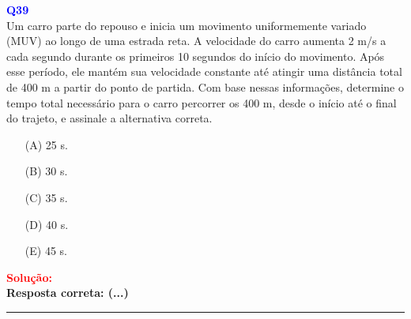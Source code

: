\documentclass[a4paper,12pt]{article}
\begin{document}
\begin{flushleft}
\textbf{\textcolor{blue}{\Large Q39}}\\

Um carro parte do repouso e inicia um movimento
uniformemente variado (MUV) ao longo de uma
estrada reta. A velocidade do carro aumenta 2 m/s
a cada segundo durante os primeiros 10
segundos do início do movimento. Após esse
período, ele mantém sua velocidade constante até
atingir uma distância total de 400 m a partir do
ponto de partida. Com base nessas informações,
determine o tempo total necessário para o carro
percorrer os 400 m, desde o início até o final do
trajeto, e assinale a alternativa correta.

\begin{itemize}
    \item[(A)] 25 s.
    \item[(B)] 30 s.
    \item[(C)] 35 s.
    \item[(D)] 40 s.
    \item[(E)] 45 s.
\end{itemize}

\vspace{0.5cm}

\textcolor{red}{\textbf{Solução:}}\\

\textbf{Resposta correta: \colorbox{green!50}{(...)}}

\end{flushleft}
\noindent\rule{\linewidth}{0.6pt}\\
\end{document}
